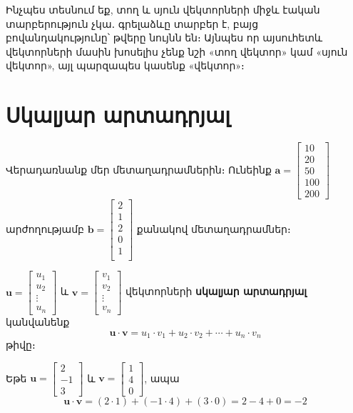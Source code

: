 
Ինչպես տեսնում եք, տող և սյուն վեկտորների միջև էական տարբե\-րու\-թյուն չկա․ գրելաձևը տարբեր է, բայց բովանդակությունը՝ թվերը նույնն են։ Այնպես որ այսուհետև վեկտորների մասին խոսելիս չենք նշի «տող վեկտոր» կամ «սյուն վեկտոր», այլ պարզապես կասենք «վեկտոր»։



\section{Սկալյար արտադրյալ}

Վերադառնանք մեր մետաղադրամներին։ Ունեինք $\mathbf{a} = \begin{bmatrix}
10 \\ 20 \\ 50 \\ 100 \\ 200
\end{bmatrix}$  արժո\-ղու\-թյամբ  $\mathbf{b} = \begin{bmatrix}
2 \\1 \\2 \\0 \\1 \\
\end{bmatrix}$ քանակով մետաղադրամներ։


\begin{definition}
\( \mathbf{u} = \begin{bmatrix} u_1 \\ u_2 \\ \vdots \\ u_n \end{bmatrix} \) և \( \mathbf{v} = \begin{bmatrix} v_1 \\ v_2 \\ \vdots \\ v_n \end{bmatrix} \) վեկտորների \textbf{սկալյար արտադրյալ} կանվանենք
\[
\mathbf{u} \cdot \mathbf{v} = u_1 \cdot v_1 + u_2 \cdot v_2 + \cdots + u_n \cdot v_n
\]
թիվը։
\end{definition}
\begin{example}
Եթե  \( \mathbf{u} = \begin{bmatrix} 2 \\ -1 \\ 3 \end{bmatrix} \) և \( \mathbf{v} = \begin{bmatrix} 1 \\ 4 \\ 0 \end{bmatrix} \), ապա
    \[
    \mathbf{u} \cdot \mathbf{v} = (2 \cdot 1) + (-1 \cdot 4) + (3 \cdot 0) = 2 - 4 + 0 = -2
    \]
\end{example}

